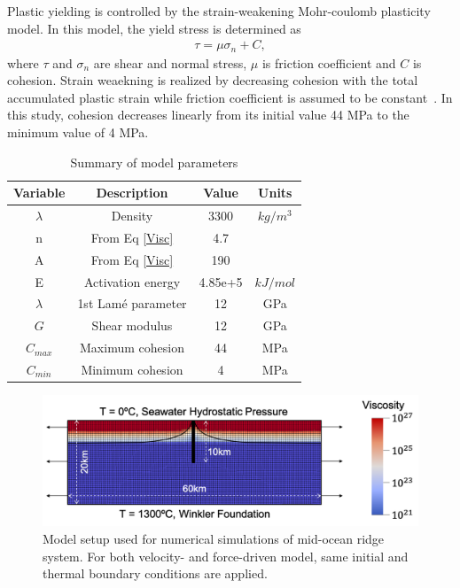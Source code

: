 \documentclass[letterpaper,12pt,notitle]{memphisthesis}                     %
\begin{document}
Plastic yielding is controlled by the strain-weakening Mohr-coulomb plasticity model. In this model, the yield stress is determined as
\begin{align}
 \tau = \mu \sigma_n + C,
\end{align}
where $\tau$ and $\sigma_{n}$ are shear and normal stress, $\mu$ is friction coefficient and $C$ is cohesion.
%
Strain weaekning is realized by decreasing cohesion with the total accumulated plastic strain while friction coefficient is assumed to be constant~\citep{Poliakov1998}. In this study, cohesion decreases linearly from its initial value 44 MPa to the minimum value of 4 MPa.
%
\begin{table}[h!]
	\centering
	\caption{Summary of model parameters}
	\label{tab:modelparams}
	\begin{tabular}{cccc}
		\toprule
		Variable & Description & Value & Units\\
		\midrule
          	$\lambda$ & Density & 3300 & $kg/m^3$\\
	        n & From Eq \ref{Visc} & 4.7 & \\
	        A & From Eq \ref{Visc} & 190 & \\
	        E & Activation energy & 4.85e+5 & $kJ/mol$ \\
	        $\lambda$ & 1st Lam\'e parameter & 12 & GPa\\
	        $G$ & Shear modulus & 12 & GPa\\
	        $C_{max}$ & Maximum cohesion & 44 & MPa\\
	        $C_{min}$ & Minimum cohesion & 4 & MPa\\
		\bottomrule
	\end{tabular}
\end{table}
%
\begin{figure}[!htb]
	\centering
	\includegraphics[width=0.8\linewidth]{./figs/modelsetup.png}
	\caption{Model setup used for numerical simulations of mid-ocean ridge system. For both velocity- and force-driven model, same initial and thermal boundary conditions are applied.}
	\label{fig:modelsetup}
\end{figure}
%
\end{document}
